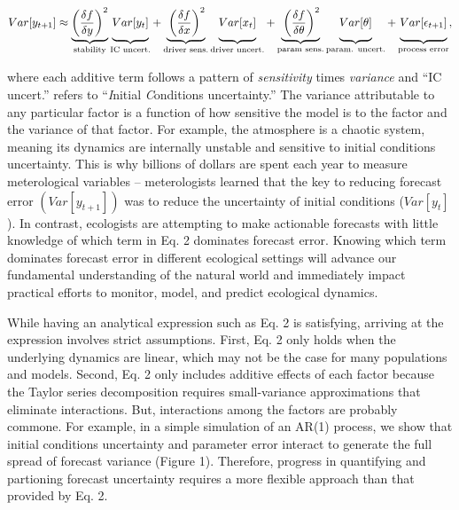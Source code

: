 \documentclass[12pt,]{article}
\begin{document}
\begin{align}
Var[y_{t+1}] \approx \underbrace{\left(\frac{\delta f}{\delta y} \right)^2}_{\text{stability}} 
               \underbrace{\vphantom{ \left(\frac{\delta f}{\delta y} \right)^2 } Var[y_t]}_{\text{IC uncert.}} +
               \underbrace{\vphantom{ \left(\frac{\delta f}{\delta y} \right)^2 }\left(\frac{\delta f}{\delta x} \right)^2}_{\text{driver sens.}} 
               \underbrace{\vphantom{ \left(\frac{\delta f}{\delta y} \right)^2 } Var[x_t]}_{\text{driver uncert.}} +
               \underbrace{\vphantom{ \left(\frac{\delta f}{\delta y} \right)^2 }\left(\frac{\delta f}{\delta \theta} \right)^2}_{\text{param sens.}}
               \underbrace{\vphantom{ \left(\frac{\delta f}{\delta y} \right)^2 } Var[\theta]}_{\text{param. uncert.}} +
               \underbrace{\vphantom{ \left(\frac{\delta f}{\delta y} \right)^2 } Var[\epsilon_{t+1}]}_{\text{process error}},
\end{align}

where each additive term follows a pattern of \emph{sensitivity} times
\emph{variance} and ``IC uncert.'' refers to ``\emph{I}nitial
\emph{C}onditions uncertainty.'' The variance attributable to any
particular factor is a function of how sensitive the model is to the
factor and the variance of that factor. For example, the atmosphere is a
chaotic system, meaning its dynamics are internally unstable and
sensitive to initial conditions uncertainty. This is why billions of
dollars are spent each year to measure meterological variables --
meterologists learned that the key to reducing forecast error
\((Var[y_{t+1}])\) was to reduce the uncertainty of initial conditions
(\(Var[y_t]\)). In contrast, ecologists are attempting to make
actionable forecasts with little knowledge of which term in Eq. 2
dominates forecast error. Knowing which term dominates forecast error in
different ecological settings will advance our fundamental understanding
of the natural world and immediately impact practical efforts to
monitor, model, and predict ecological dynamics.

While having an analytical expression such as Eq. 2 is satisfying,
arriving at the expression involves strict assumptions. First, Eq. 2
only holds when the underlying dynamics are linear, which may not be the
case for many populations and models. Second, Eq. 2 only includes
additive effects of each factor because the Taylor series decomposition
requires small-variance approximations that eliminate interactions. But,
interactions among the factors are probably commone. For example, in a
simple simulation of an AR(1) process, we show that initial conditions
uncertainty and parameter error interact to generate the full spread of
forecast variance (Figure 1). Therefore, progress in quantifying and
partioning forecast uncertainty requires a more flexible approach than
that provided by Eq. 2.
\end{document}
